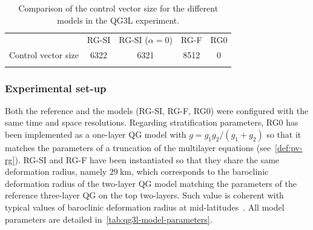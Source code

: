 \documentclass[
  draft
]{agujournal2025}
\begin{document}
\begin{table}[h]
    \begin{center}
        \begin{tabular}{lcccc}
            & RG-SI & RG-SI ($\alpha = 0$) & RG-F & RG0 \\
            \savehline
            Control vector size &  6322 & 6321 & 8512 & 0 \\
            \savehline \\
        \end{tabular}
    \end{center}
    \caption{Comparison of the control vector size for the different models in the QG3L experiment.}\label{tab:qg3l-control-vector-size}
\end{table}


\subsubsection{Experimental set-up}

Both the reference and the models (RG-SI, RG-F, RG0) were configured with the same time and space resolutions. Regarding stratification parameters, RG0 has been implemented as a one-layer QG model with $g = g_1 g_2/(g_1+g_2)$ so that it matches the parameters of a truncation of the multilayer equations (see~\cref{def:pv-rg}). RG-SI and RG-F have been instantiated so that they share the same deformation radius, namely $\qty{29}{\kilo\meter}$, which corresponds to the baroclinic deformation radius of the two-layer QG model matching the parameters of the reference three-layer QG on the top two-layers. Such value is coherent with typical values of baroclinic deformation radius at mid-latitudes~\cite{chelton1998}. All model parameters are detailed in~\cref{tab:qg3l-model-parameters}.
\end{document}
